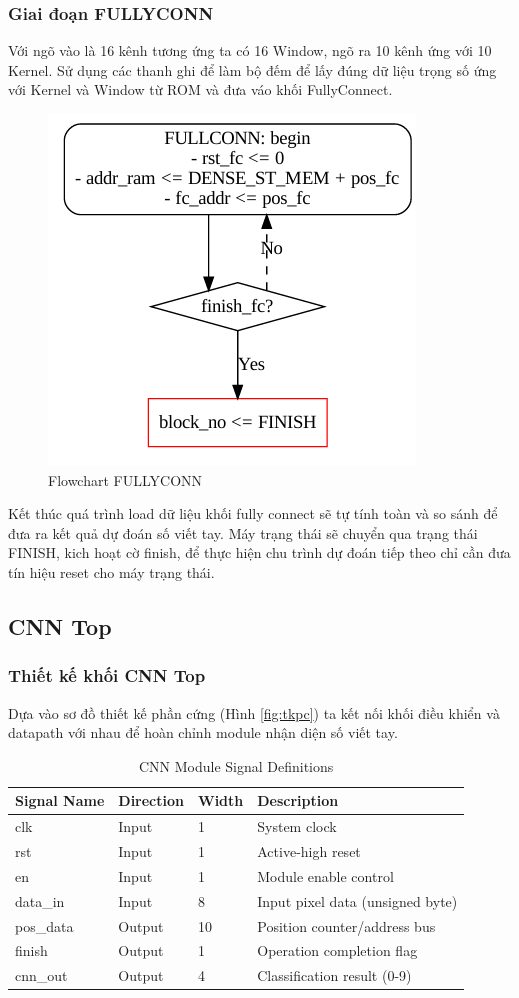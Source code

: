 \subsubsection{Giai đoạn FULLYCONN}
Với ngõ vào là 16 kênh tương ứng ta có 16 Window, ngõ ra 10 kênh ứng với 10 Kernel. Sử dụng các thanh ghi để làm bộ đếm để lấy đúng dữ liệu trọng số ứng với Kernel và Window từ ROM và đưa váo khối FullyConnect.

\begin{figure}[H]
    \centering
    \includegraphics[width=0.5\linewidth]{Images/fcflow.png}
    \caption{Flowchart FULLYCONN}
    \label{fig:enter-label}
\end{figure}

Kết thúc quá trình load dữ liệu khối fully connect sẽ tự tính toàn và so sánh để đưa ra kết quả dự đoán số viết tay. Máy trạng thái sẽ chuyển qua trạng thái FINISH, kich hoạt cờ finish, để thực hiện chu trình dự đoán tiếp theo chỉ cần đưa tín hiệu reset cho máy trạng thái. 

\subsection{CNN Top}
\subsubsection{Thiết kế khối CNN Top}
Dựa vào sơ đồ thiết kế phần cứng (Hình \ref{fig:tkpc}) ta kết nối khối điều khiển và datapath với nhau để hoàn chỉnh module nhận diện số viết tay.
\begin{table}[H]
\centering
\caption{CNN Module Signal Definitions}
\label{tab:cnn_signals}
\begin{tabular}{llll}
\toprule
\textbf{Signal Name} & \textbf{Direction} & \textbf{Width} & \textbf{Description} \\ 
\midrule
clk & Input & 1 & System clock \\
rst & Input & 1 & Active-high reset \\
en & Input & 1 & Module enable control \\
data\_in & Input & 8 & Input pixel data (unsigned byte) \\ 
pos\_data & Output & 10 & Position counter/address bus \\
finish & Output & 1 & Operation completion flag \\
cnn\_out & Output & 4 & Classification result (0-9) \\ 
\bottomrule
\end{tabular}
\end{table}

